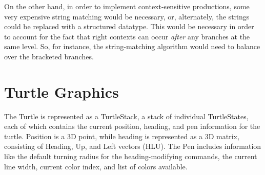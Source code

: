 \documentclass[]{article}
\begin{document}
On the other hand, in order to implement context-sensitive productions,
some very expensive string matching would be necessary, or, alternately,
the strings could be replaced with a structured datatype. This would be
necessary in order to account for the fact that right contexts can occur
\emph{after} any branches at the same level. So, for instance, the
string-matching algorithm would need to balance over the bracketed
branches.

\section{Turtle Graphics}

The Turtle is represented as a TurtleStack, a stack of individual
TurtleStates, each of which contains the current position, heading, and
pen information for the turtle. Position is a 3D point, while heading is
represented as a 3D matrix, consisting of Heading, Up, and Left vectors
(HLU). The Pen includes information like the default turning radius for
the heading-modifying commands, the current line width, current color
index, and list of colors available.
\end{document}
